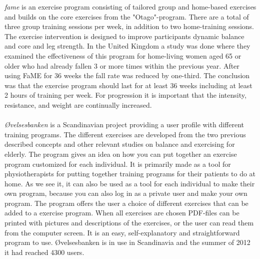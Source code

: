 \emph{\ac{fame}} is an exercise program consisting of tailored group and home-based exercises and builds on the core exercises from the "Otago"-program.  There are a total of three group training sessions per week, in addition to two home-training sessions. The exercise intervention is designed to improve participants dynamic balance and core and leg strength.  In the United Kingdom a study was done where they examined the effectiveness of this program for home-living women aged 65 or older who had already fallen 3 or more times within the previous year. After using FaME for 36 weeks the fall rate was reduced by one-third. The conclusion was that the exercise program should last for at least 36 weeks including at least 2 hours of training per week. For progression it is important that the intensity, resistance, and weight are continually increased.\cite{fame}\\ \\
\emph{{Ø}velsesbanken} is a Scandinavian project providing a user profile with different training programs. The different exercises are developed from the two previous described concepts and other relevant studies on balance and exercising for elderly. The program gives an idea on how you can put together an exercise program customized for each individual. It is primarily made as a tool for physiotherapists for putting together training programs for their patients to do at home. As we see it, it can also be used as a tool for each individual to make their own program, because you can also log in as a private user and make your own program. The program offers the user a choice of different exercises that can be added to a exercise program. When all exercises are chosen PDF-files can be printed with pictures and descriptions of the exercises, or the user can read them from the computer screen. It is an easy, self-explanatory and straightforward program to use. {Ø}velsesbanken is in use in Scandinavia and the summer of 2012 it had reached 4300 users. \cite{ovelsesbank}\\ \\
